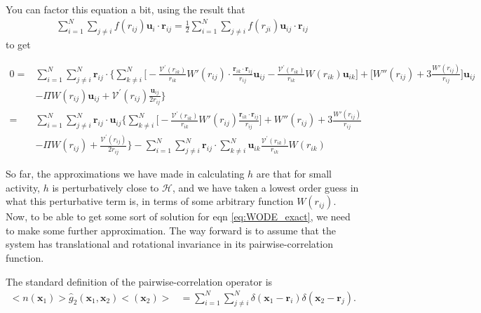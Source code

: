 \documentclass[twocolumn,amsmath,amssymb,aps]{revtex4-1}%
\begin{document}
You can factor this equation a bit, using the result that
\begin{align}
  \sum_{i=1}^N\sum_{j\neq i}f(r_{ij}) \bm{u}_i\cdot\bm{r}_{ij}
  =\frac{1}{2}\sum_{i=1}^N\sum_{j\neq i}f(r_{ji})\bm{u}_{ij}\cdot\bm{r}_{ij}
\end{align}
to get
\begin{widetext}
\begin{align}\label{eq:WODE_exact}
  0=
  &\sum_{i=1}^N\sum_{j\neq i}^N\bm{r}_{ij}\cdot\bigg\{\sum_{k\neq i}^N\bigg[
    -\frac{\mathcal{V}^{\prime}(r_{ik})}{r_{ik}}
    W'(r_{ij})
    \cdot\frac{\bm{r}_{ik}\cdot\bm{r}_{ij}}{r_{ij}}\bm{u}_{ij}
    -\frac{\mathcal{V}^{\prime}(r_{ik})}{r_{ik}}W(r_{ik})\bm{u}_{ik}\bigg]
  +\bigg[W''(r_{ij})
    +3\frac{W'(r_{ij})}{r_{ij}}\bigg]\bm{u}_{ij}\nonumber\\
  &-\Pi W(r_{ij})\bm{u}_{ij}
  +\mathcal{V}^{\prime}(r_{ij})\frac{\bm{u}_{ij}}{2r_{ij}}\bigg\}\nonumber\\
  =&\sum_{i=1}^N\sum_{j\neq i}^N\bm{r}_{ij}\cdot\bm{u}_{ij}
  \bigg\{\sum_{k\neq i}^N\bigg[
    -\frac{\mathcal{V}^{\prime}(r_{ik})}{r_{ik}}
    W'(r_{ij})\frac{\bm{r}_{ik}\cdot\bm{r}_{ij}}{r_{ij}}\bigg]
  +W''(r_{ij})+3\frac{W'(r_{ij})}{r_{ij}}\nonumber\\
  &-\Pi W(r_{ij})
  +\frac{\mathcal{V}^{\prime}(r_{ij})}{2r_{ij}}\bigg\}
  -\sum_{i=1}^N\sum_{j\neq i}^N\bm{r}_{ij}\cdot\sum_{k\neq i}^N
  \bm{u}_{ik}\frac{\mathcal{V}^{\prime}(r_{ik})}{r_{ik}}W(r_{ik})
\end{align}
\end{widetext}
So far, the approximations we have made in calculating $h$ are that for
small activity, $h$ is perturbatively close to $\mathcal{H}$, and we have
taken a lowest order guess in what this perturbative term is, in terms of some
arbitrary function $W(r_{ij})$. Now, to be able to get some sort of solution
for eqn \ref{eq:WODE_exact}, we need to make some further approximation. The
way forward is to assume that the system has translational and rotational
invariance in its pairwise-correlation function.

The standard definition of the pairwise-correlation operator is
\begin{align}
  <n(\bm{x}_1)>\hat{g}_2(\bm{x}_1,\bm{x}_2)<(\bm{x}_2)>
  &=\sum_{i=1}^N\sum_{j\neq i}^N\delta(\bm{x}_1-\bm{r}_i)
    \delta(\bm{x}_2-\bm{r}_j).
\end{align}
\end{document}
